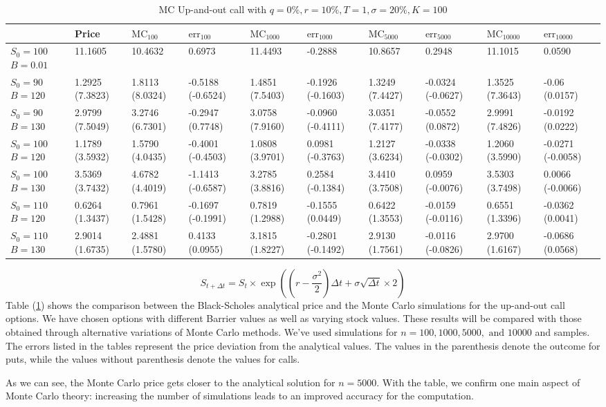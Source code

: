 \begin{center}
	\begin{table}[H]
    \begin{tabular}{ | m{4em} | m{1.4cm}| m{1.4cm} | m{1.4cm}| m{1.4cm} | m{1.37cm} | m{1.4cm} | m{1.4cm} | m{1.4cm} | m{1.45cm} |} 
  \hline
   & Price & $\text{MC}_{100}$ & $\text{err}_{100}$ & $\text{MC}_{1000}$ & $\text{err}_{1000}$ & $\text{MC}_{5000}$ & $\text{err}_{5000}$ & $\text{MC}_{10000}$ & $\text{err}_{10000}$  \\ 
   \hline
   $S_0=100$ $B=0.01$ & 11.1605 & 10.4632 & 0.6973 & 11.4493 & -0.2888 & 10.8657 & 0.2948 & 11.1015 & 0.0590 \\
  \hline
	$S_0=90$ $B=120$ & 1.2925 (7.3823) & 1.8113 (8.0324)  & -0.5188 (-0.6524) & 1.4851 (7.5403) & -0.1926 (-0.1603) & 1.3249 (7.4427) & -0.0324 (-0.0627) & 1.3525 (7.3643) & -0.06 (0.0157) \\ 
	\hline
	$S_0=90$ $B=130$ & 2.9799 (7.5049) & 3.2746 (6.7301) & -0.2947 (0.7748) & 3.0758 (7.9160) & -0.0960 (-0.4111) &  3.0351 (7.4177) & -0.0552 (0.0872) & 2.9991 (7.4826) & -0.0192 (0.0222) \\ 
  \hline
  $S_0=100$ $B=120$ & 1.1789 (3.5932) & 1.5790 (4.0435) & -0.4001 (-0.4503) & 1.0808 (3.9701)  & 0.0981 (-0.3763) & 1.2127 (3.6234) & -0.0338 (-0.0302) & 1.2060 (3.5990) & -0.0271 (-0.0058) \\ 
  \hline
  $S_0=100$ $B=130$ & 3.5369 (3.7432) & 4.6782 (4.4019)  & -1.1413 (-0.6587) & 3.2785 (3.8816) & 0.2584 (-0.1384) & 3.4410 (3.7508) & 0.0959 (-0.0076) & 3.5303 (3.7498)  & 0.0066 (-0.0066)\\ 
  \hline 
  $S_0=110$ $B=120$ & 0.6264 (1.3437) & 0.7961 (1.5428) & -0.1697 (-0.1991) & 0.7819 (1.2988) & -0.1555 (0.0449) & 0.6422 (1.3553) & -0.0159 (-0.0116) & 0.6551 (1.3396) & -0.0362 (0.0041) \\
  \hline
  $S_0=110$ $B=130$ & 2.9014 (1.6735) & 2.4881 (1.5780)  & 0.4133 (0.0955) & 3.1815 (1.8227) & -0.2801 (-0.1492) & 2.9130 (1.7561) & -0.0116 (-0.0826) & 2.9700 (1.6167) & -0.0686 (0.0568)\\
  \hline
\end{tabular}
\caption{MC Up-and-out call with $q=0\%,r=10\%, T=1,\sigma=20\%,K=100$}
\label{tab:MC_barrer}
\end{table}
\end{center}
\begin{equation}
	S_{t+\Delta t}=S_t\times\exp\left(\left(r-\frac{\sigma^2}{2}\right)\Delta t+\sigma\sqrt{\Delta t}\times 2\right)
\end{equation}
Table (\ref{tab:MC_barrer}) shows the comparison between the Black-Scholes analytical price and the Monte Carlo simulations for the up-and-out call options. We have chosen options with different Barrier values as well as varying stock values. These results will be compared with those obtained through alternative variations of Monte Carlo methods. We've used simulations for $n=100,1000,5000,\text{ and }10000$ and samples. The errors listed in the tables represent the price deviation from the analytical values. The values in the parenthesis denote the outcome for puts, while the values without parenthesis denote the values for calls.

As we can see, the Monte Carlo price gets closer to the analytical solution for $n=5000$. With the table, we confirm one main aspect of Monte Carlo theory: increasing the number of simulations leads to an improved accuracy for the computation.
